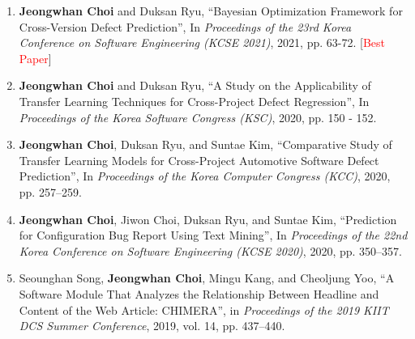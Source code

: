 \documentclass[10pt]{article}
\newenvironment{changemargin}[2]{
  \begin{list}{}{
    \setlength{\topsep}{0pt}
    \setlength{\leftmargin}{#1}
    \setlength{\rightmargin}{#2}
    \setlength{\listparindent}{\parindent}
    \setlength{\itemindent}{\parindent}
    \setlength{\parsep}{\parskip}
  }
  \item[]}{\end{list}
}
\newcommand{\RED}[1]{\textcolor{red}{#1}}
\newenvironment{body} {
	\vspace*{-16pt}
	\begin{changemargin}{-0.25in}{-0.5in}
  }
	{\end{changemargin}
}
\begin{document}
\begin{body}
\begin{enumerate}
    \item \textbf{Jeongwhan Choi} and Duksan Ryu, ``Bayesian Optimization Framework for Cross-Version Defect Prediction'', In \emph{Proceedings of the 23rd Korea Conference on Software Engineering (KCSE 2021)}, 2021, pp. 63-72.  [\RED{Best Paper}]
    \item \textbf{Jeongwhan Choi} and Duksan Ryu, ``A Study on the Applicability of Transfer Learning Techniques for Cross-Project Defect Regression'', In \emph{Proceedings of the Korea Software Congress (KSC)}, 2020, pp. 150 - 152.
    \item \textbf{Jeongwhan Choi}, Duksan Ryu, and Suntae Kim, ``Comparative Study of Transfer Learning Models for Cross-Project Automotive Software Defect Prediction'', In \emph{Proceedings of the Korea Computer Congress (KCC)}, 2020, pp. 257–259.
    \item \textbf{Jeongwhan Choi}, Jiwon Choi, Duksan Ryu, and Suntae Kim, ``Prediction for Configuration Bug Report Using Text Mining'', In \emph{Proceedings of the 22nd Korea Conference on Software Engineering (KCSE 2020)}, 2020, pp. 350–357.
    \item Seounghan Song, \textbf{Jeongwhan Choi}, Mingu Kang, and Cheoljung Yoo, ``A Software Module That Analyzes the Relationship Between Headline and Content of the Web Article: CHIMERA'', in \emph{Proceedings of the 2019 KIIT DCS Summer Conference}, 2019, vol. 14, pp. 437–440.
\end{enumerate}


\end{body}
\end{document}
